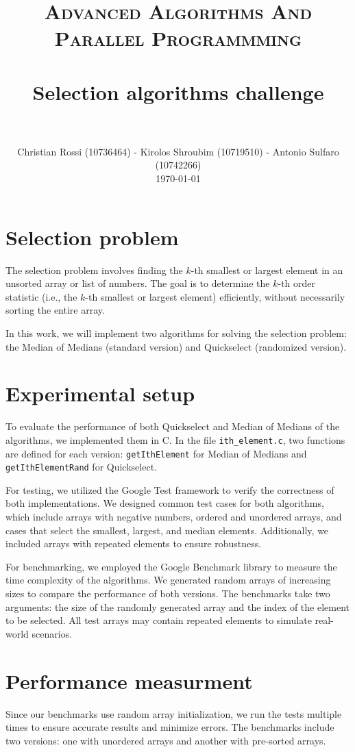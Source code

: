 \documentclass[paper=a4, fontsize=11pt]{scrartcl}
\title{
		\vspace{-1in} 	
		\usefont{OT1}{bch}{b}{n}
		\normalfont \normalsize \textsc{Advanced Algorithms And Parallel Programmming} \\ [25pt]
		\horrule{0.5pt} \\[0.4cm]
		\huge Selection algorithms challenge \\
		\horrule{2pt} \\[0.5cm]
}
\author{
		\normalfont 								\normalsize
        Christian Rossi (10736464) - Kirolos Shroubim (10719510) - Antonio Sulfaro (10742266)\\[-3pt]		\normalsize
        \today
}
\date{}
\numberwithin{equation}{section}
\numberwithin{figure}{section}
\numberwithin{table}{section}
\begin{document}
    \maketitle

    \section{Selection problem}
    The selection problem involves finding the $k$-th smallest or largest element in an unsorted array or list of numbers.
    The goal is to determine the $k$-th order statistic (i.e., the $k$-th smallest or largest element) efficiently, without necessarily sorting the entire array.

    In this work, we will implement two algorithms for solving the selection problem: the Median of Medians (standard version) and Quickselect (randomized version).

    \section{Experimental setup}
    To evaluate the performance of both Quickselect and Median of Medians of the algorithms, we implemented them in C.
    In the file \texttt{ith\_element.c}, two functions are defined for each version: \texttt{getIthElement} for Median of Medians and \texttt{getIthElementRand} for Quickselect. 

    For testing, we utilized the Google Test framework to verify the correctness of both implementations.
    We designed common test cases for both algorithms, which include arrays with negative numbers, ordered and unordered arrays, and cases that select the smallest, largest, and median elements.
    Additionally, we included arrays with repeated elements to ensure robustness.

    For benchmarking, we employed the Google Benchmark library to measure the time complexity of the algorithms.
    We generated random arrays of increasing sizes to compare the performance of both versions.
    The benchmarks take two arguments: the size of the randomly generated array and the index of the element to be selected.
    All test arrays may contain repeated elements to simulate real-world scenarios.

    \section{Performance measurment}
    Since our benchmarks use random array initialization, we run the tests multiple times to ensure accurate results and minimize errors.
    The benchmarks include two versions: one with unordered arrays and another with pre-sorted arrays.
\end{document}
